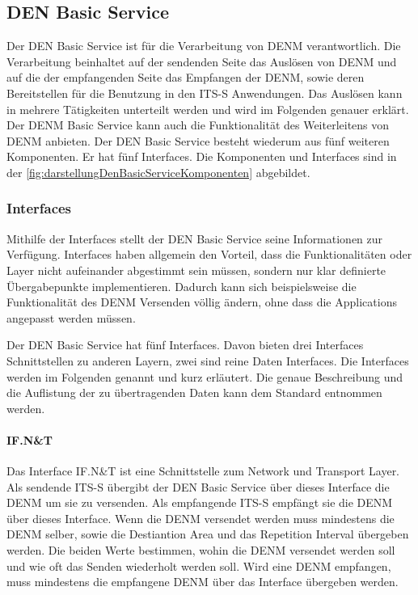 \subsection{DEN Basic Service}
Der \ac{DEN} Basic Service ist für die Verarbeitung von \ac{DENM} verantwortlich. Die Verarbeitung beinhaltet auf der sendenden Seite das Auslösen von \ac{DENM} und auf die der empfangenden Seite das Empfangen der \ac{DENM}, sowie deren Bereitstellen für die Benutzung in den \ac{ITS-S} Anwendungen. Das Auslösen kann in mehrere Tätigkeiten unterteilt werden und wird im Folgenden genauer erklärt. Der \ac{DENM} Basic Service kann auch die Funktionalität des Weiterleitens von \ac{DENM} anbieten. Der \ac{DEN} Basic Service besteht wiederum aus fünf weiteren Komponenten. Er hat fünf Interfaces. Die Komponenten und Interfaces sind in der \autoref{fig:darstellungDenBasicServiceKomponenten} abgebildet.

\subsubsection{Interfaces}
Mithilfe der Interfaces stellt der \ac{DEN} Basic Service seine Informationen zur Verfügung. Interfaces haben allgemein den Vorteil, dass die Funktionalitäten oder Layer nicht aufeinander abgestimmt sein müssen, sondern nur klar definierte Übergabepunkte implementieren. Dadurch kann sich beispielsweise die Funktionalität des \ac{DENM} Versenden völlig ändern, ohne dass die Applications angepasst werden müssen. 

Der \ac{DEN} Basic Service hat fünf Interfaces. Davon bieten drei Interfaces Schnittstellen zu anderen Layern, zwei sind reine Daten Interfaces. Die Interfaces werden im Folgenden genannt und kurz erläutert. Die genaue Beschreibung und die Auflistung der zu übertragenden Daten  kann dem Standard \cite{en302637-3} entnommen werden.

\paragraph{IF.N\&T}
Das Interface IF.N\&T ist  eine Schnittstelle zum Network und Transport Layer. Als sendende \ac{ITS-S} übergibt der \ac{DEN} Basic Service über dieses Interface die \ac{DENM} um sie zu versenden. Als empfangende \ac{ITS-S} empfängt sie die \ac{DENM} über dieses Interface. Wenn die \ac{DENM} versendet werden muss mindestens die \ac{DENM} selber, sowie die Destiantion Area und das Repetition Interval übergeben werden. Die beiden Werte bestimmen, wohin die \ac{DENM} versendet werden soll und wie oft das Senden wiederholt werden soll. Wird eine \ac{DENM} empfangen, muss mindestens die empfangene  \ac{DENM} über das Interface übergeben werden.

